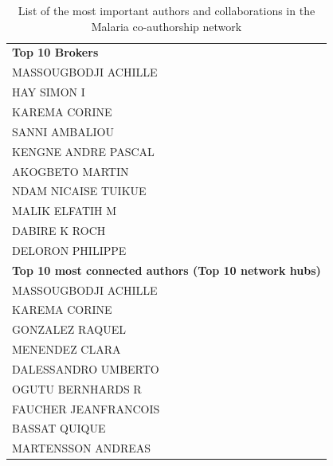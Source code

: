 \begin{table}[!ht]
\caption{List of the most important authors and collaborations in the Malaria co-authorship network}
\label{table: malaria_list}
\centering \scriptsize
\begin{tabular}{l}
  \toprule
\textbf{Top 10 Brokers}\\
\hspace{20pt}MASSOUGBODJI ACHILLE\\
\hspace{20pt}HAY SIMON I\\
\hspace{20pt}KAREMA CORINE\\
\hspace{20pt}SANNI AMBALIOU\\
\hspace{20pt}KENGNE ANDRE PASCAL\\
\hspace{20pt}AKOGBETO MARTIN\\
\hspace{20pt}NDAM NICAISE TUIKUE\\
\hspace{20pt}MALIK ELFATIH M\\
\hspace{20pt}DABIRE K ROCH\\
\hspace{20pt}DELORON PHILIPPE\\
\hline
\textbf{Top 10 most connected authors (Top 10 network hubs)}\\
\hspace{20pt}MASSOUGBODJI ACHILLE\\
\hspace{20pt}KAREMA CORINE\\
\hspace{20pt}GONZALEZ RAQUEL\\
\hspace{20pt}MENENDEZ CLARA\\
\hspace{20pt}DALESSANDRO UMBERTO\\
\hspace{20pt}OGUTU BERNHARDS R\\
\hspace{20pt}FAUCHER JEANFRANCOIS\\
\hspace{20pt}BASSAT QUIQUE\\
\hspace{20pt}MARTENSSON ANDREAS\\

\end{tabular}
\end{table}
